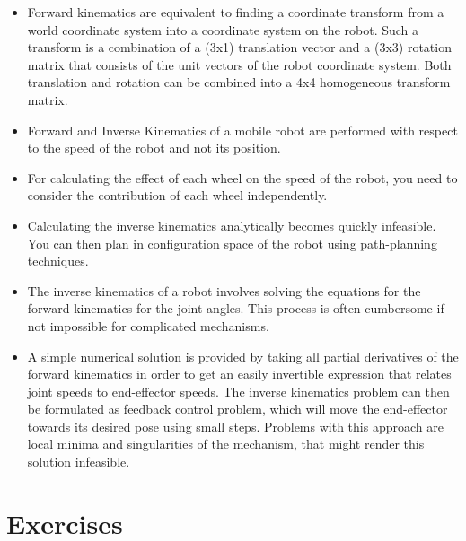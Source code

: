 \begin{itemize}
\item Forward kinematics are equivalent to finding a coordinate transform from a world coordinate system into a coordinate system on the robot. Such a transform is a combination of a (3x1) translation vector and a (3x3) rotation matrix that consists of the unit vectors of the robot coordinate system. Both translation and rotation can be combined into a 4x4 homogeneous transform matrix.
\item Forward and Inverse Kinematics of a mobile robot are performed with respect to the speed of the robot and not its position.
\item For calculating the effect of each wheel on the speed of the robot, you need to consider the contribution of each wheel independently.
\item Calculating the inverse kinematics analytically becomes quickly infeasible. You can then plan in configuration space of the robot using path-planning techniques.
\item The inverse kinematics of a robot involves solving the equations for the forward kinematics for the joint angles. This process is often cumbersome if not impossible for complicated mechanisms.
\item A simple numerical solution is provided by taking all partial derivatives of the forward kinematics in order to get an easily invertible expression that relates joint speeds to end-effector speeds.
The inverse kinematics problem can then be formulated as feedback control problem, which will move the end-effector towards its desired pose using small steps. Problems with this approach are local minima and singularities of the mechanism, that might render this solution infeasible.
\end{itemize}

\section*{Exercises}\small
